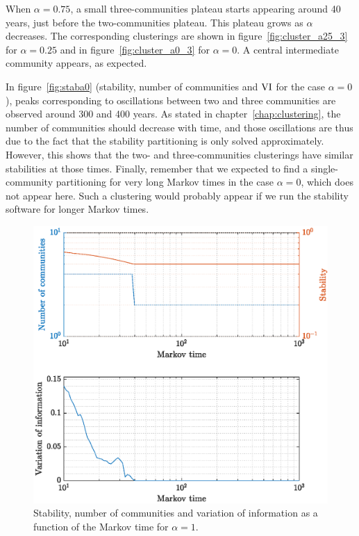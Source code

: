When $\alpha = 0.75$, a small three-communities plateau starts appearing around 40 years, just before the two-communities plateau. This plateau grows as $\alpha$ decreases. The corresponding clusterings are shown in figure~\ref{fig:cluster_a25_3} for $\alpha = 0.25$ and in figure~\ref{fig:cluster_a0_3} for $\alpha = 0$. A central intermediate community appears, as expected.

In figure~\ref{fig:staba0} (stability, number of communities and $\operatorname{VI}$ for the case $\alpha = 0$), peaks corresponding to oscillations between two and three communities are observed around 300 and 400 years. As stated in chapter~\ref{chap:clustering}, the number of communities should decrease with time, and those oscillations are thus due to the fact that the stability partitioning is only solved approximately. However, this shows that the two- and three-communities clusterings have similar stabilities at those times. Finally, remember that we expected to find a single-community partitioning for very long Markov times in the case $\alpha = 0$, which does not appear here. Such a clustering would probably appear if we run the stability software for longer Markov times.


\begin{figure}[!htp]
	\centering
	\includegraphics[width = .7\textwidth, height = .4\textheight]{fig/problem2box/stab_a1.eps}
	\caption{Stability, number of communities and variation of information as a function of the Markov time for $\alpha = 1$.}
	\label{fig:staba1}
\end{figure}

